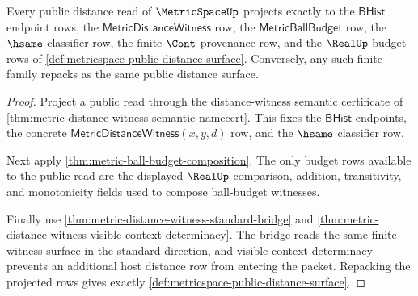 \begin{theorem}
\label{thm:metricspace-public-distance-surface-exhaustion}
Every public distance read of $\MetricSpaceUp$ projects exactly to the
$\mathsf{BHist}$ endpoint rows, the $\mathsf{MetricDistanceWitness}$ row, the
$\mathsf{MetricBallBudget}$ row, the $\hsame$ classifier row, the finite
$\Cont$ provenance row, and the $\RealUp$ budget rows of
\autoref{def:metricspace-public-distance-surface}. Conversely, any such finite
family repacks as the same public distance surface.
\end{theorem}
\begin{proof}
Project a public read through the distance-witness semantic certificate of
\autoref{thm:metric-distance-witness-semantic-namecert}. This fixes the
$\mathsf{BHist}$ endpoints, the concrete
$\mathsf{MetricDistanceWitness}(x,y,d)$ row, and the $\hsame$ classifier row.

Next apply \autoref{thm:metric-ball-budget-composition}. The only budget rows
available to the public read are the displayed $\RealUp$ comparison, addition,
transitivity, and monotonicity fields used to compose ball-budget witnesses.

Finally use \autoref{thm:metric-distance-witness-standard-bridge} and
\autoref{thm:metric-distance-witness-visible-context-determinacy}. The bridge
reads the same finite witness surface in the standard direction, and visible
context determinacy prevents an additional host distance row from entering the
packet. Repacking the projected rows gives exactly
\autoref{def:metricspace-public-distance-surface}.
\end{proof}

